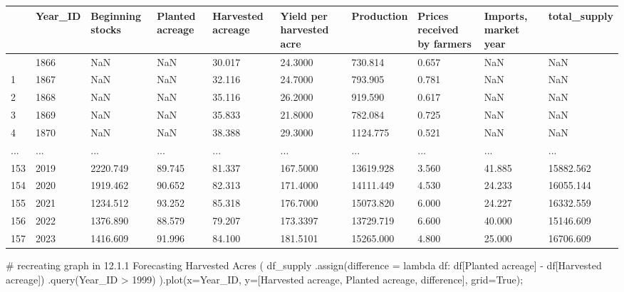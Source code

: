 \documentclass[
  letterpaper,
  DIV=11,
  numbers=noendperiod]{scrreprt}
\newenvironment{Shaded}{\begin{snugshade}}{\end{snugshade}}
\newcommand{\CommentTok}[1]{\textcolor[rgb]{0.37,0.37,0.37}{#1}}
\newcommand{\KeywordTok}[1]{\textcolor[rgb]{0.00,0.23,0.31}{#1}}
\newcommand{\NormalTok}[1]{\textcolor[rgb]{0.00,0.23,0.31}{#1}}
\newcommand{\OperatorTok}[1]{\textcolor[rgb]{0.37,0.37,0.37}{#1}}
\newcommand{\StringTok}[1]{\textcolor[rgb]{0.13,0.47,0.30}{#1}}
\newcommand{\VariableTok}[1]{\textcolor[rgb]{0.07,0.07,0.07}{#1}}
\begin{document}
\begin{longtable}[]{@{}llllllllll@{}}
\toprule\noalign{}
& Year\_ID & Beginning stocks & Planted acreage & Harvested acreage &
Yield per harvested acre & Production & Prices received by farmers &
Imports, market year & total\_supply \\
\midrule\noalign{}
\endhead
\bottomrule\noalign{}
\endlastfoot
0 & 1866 & NaN & NaN & 30.017 & 24.3000 & 730.814 & 0.657 & NaN & NaN \\
1 & 1867 & NaN & NaN & 32.116 & 24.7000 & 793.905 & 0.781 & NaN & NaN \\
2 & 1868 & NaN & NaN & 35.116 & 26.2000 & 919.590 & 0.617 & NaN & NaN \\
3 & 1869 & NaN & NaN & 35.833 & 21.8000 & 782.084 & 0.725 & NaN & NaN \\
4 & 1870 & NaN & NaN & 38.388 & 29.3000 & 1124.775 & 0.521 & NaN &
NaN \\
... & ... & ... & ... & ... & ... & ... & ... & ... & ... \\
153 & 2019 & 2220.749 & 89.745 & 81.337 & 167.5000 & 13619.928 & 3.560 &
41.885 & 15882.562 \\
154 & 2020 & 1919.462 & 90.652 & 82.313 & 171.4000 & 14111.449 & 4.530 &
24.233 & 16055.144 \\
155 & 2021 & 1234.512 & 93.252 & 85.318 & 176.7000 & 15073.820 & 6.000 &
24.227 & 16332.559 \\
156 & 2022 & 1376.890 & 88.579 & 79.207 & 173.3397 & 13729.719 & 6.600 &
40.000 & 15146.609 \\
157 & 2023 & 1416.609 & 91.996 & 84.100 & 181.5101 & 15265.000 & 4.800 &
25.000 & 16706.609 \\
\end{longtable}

\begin{Shaded}
\begin{Highlighting}[]
\CommentTok{\# recreating graph in 12.1.1 Forecasting Harvested Acres}
\NormalTok{(}
\NormalTok{df\_supply}
\NormalTok{    .assign(difference }\OperatorTok{=} \KeywordTok{lambda}\NormalTok{ df: df[}\StringTok{\textquotesingle{}Planted acreage\textquotesingle{}}\NormalTok{] }\OperatorTok{{-}}\NormalTok{ df[}\StringTok{\textquotesingle{}Harvested acreage\textquotesingle{}}\NormalTok{])}
\NormalTok{    .query(}\StringTok{\textquotesingle{}Year\_ID \textgreater{} 1999\textquotesingle{}}\NormalTok{)}
\NormalTok{).plot(x}\OperatorTok{=}\StringTok{\textquotesingle{}Year\_ID\textquotesingle{}}\NormalTok{, y}\OperatorTok{=}\NormalTok{[}\StringTok{\textquotesingle{}Harvested acreage\textquotesingle{}}\NormalTok{, }\StringTok{\textquotesingle{}Planted acreage\textquotesingle{}}\NormalTok{, }\StringTok{\textquotesingle{}difference\textquotesingle{}}\NormalTok{], grid}\OperatorTok{=}\VariableTok{True}\NormalTok{)}\OperatorTok{;}
\end{Highlighting}
\end{Shaded}
\end{document}
